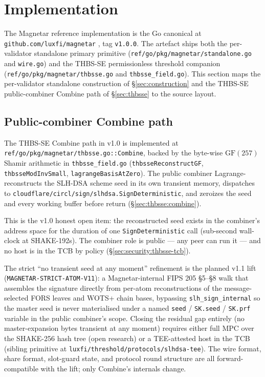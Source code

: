 \section{Implementation}
\label{sec:implementation}

The Magnetar reference implementation is the Go canonical at
\texttt{github.com/luxfi/magnetar} \cite{magnetar}, tag
\texttt{v1.0.0}. The artefact ships both the per-validator standalone
primary primitive
(\texttt{ref/go/pkg/magnetar/standalone.go} and \texttt{wire.go})
and the THBS-SE permissionless threshold companion
(\texttt{ref/go/pkg/magnetar/thbsse.go} and
\texttt{thbsse\_field.go}). This section maps the
per-validator standalone construction of \S\ref{sec:construction}
and the THBS-SE public-combiner Combine path of \S\ref{sec:thbsse} to
the source layout.

\subsection{Public-combiner Combine path}
\label{sec:impl:combine-path}

The THBS-SE Combine path in v1.0 is implemented at
\texttt{ref/go/pkg/magnetar/thbsse.go::Combine}, backed by the
byte-wise $\mathrm{GF}(257)$ Shamir arithmetic in
\texttt{thbsse\_field.go} (\texttt{thbsseReconstructGF},
\texttt{thbsseModInvSmall}, \texttt{lagrangeBasisAtZero}). The
public combiner Lagrange-reconstructs the SLH-DSA scheme seed in
its own transient memory, dispatches to
\texttt{cloudflare/circl/sign/slhdsa.SignDeterministic}, and
zeroizes the seed and every working buffer before return
(\S\ref{sec:thbsse:combine}).

This is the v1.0 honest open item: the reconstructed seed exists in
the combiner's address space for the duration of one
\texttt{SignDeterministic} call (sub-second wall-clock at
SHAKE-192s). The combiner role is public --- any peer can run it ---
and no host is in the TCB by policy (\S\ref{sec:security:thbsse-tcb}).

The strict ``no transient seed at any moment'' refinement is the
planned v1.1 lift (\texttt{MAGNETAR-STRICT-ATOM-V11}): a
Magnetar-internal FIPS 205 \S5--\S8 walk that assembles the
signature directly from per-atom reconstructions of the
message-selected FORS leaves and WOTS+ chain bases, bypassing
\texttt{slh\_sign\_internal} so the master seed is never
materialised under a named \texttt{seed} / \texttt{SK.seed} /
\texttt{SK.prf} variable in the public combiner's scope. Closing
the residual gap entirely (no master-expansion bytes transient at
any moment) requires either full MPC over the SHAKE-256 hash tree
(open research) or a TEE-attested host in the TCB (sibling
primitive at \texttt{luxfi/threshold/protocols/slhdsa-tee}). The
wire format, share format, slot-guard state, and protocol round
structure are all forward-compatible with the lift; only Combine's
internals change.

